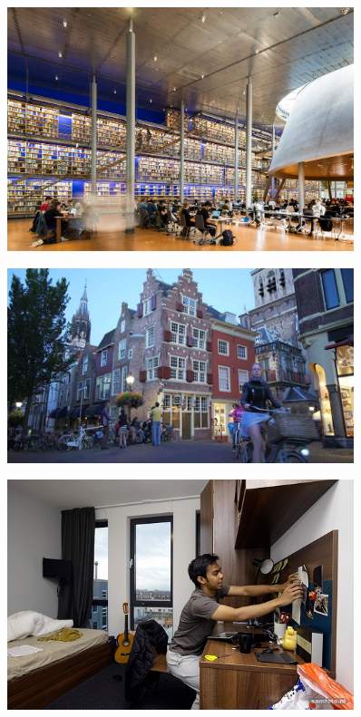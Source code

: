 \begin{frame}
    \delft
    \begin{figure}
        \includegraphics[width=0.9\textwidth]{images/books.jpg}
    \end{figure}
\end{frame}

\begin{frame}
    \delft
    \begin{figure}
        \includegraphics[width=0.9\textwidth]{images/delft-city.jpg}
    \end{figure}
\end{frame}

\begin{frame}
    \delft
    \begin{figure}
        \includegraphics[width=0.9\textwidth]{images/duwo.jpg}
    \end{figure}
\end{frame}

